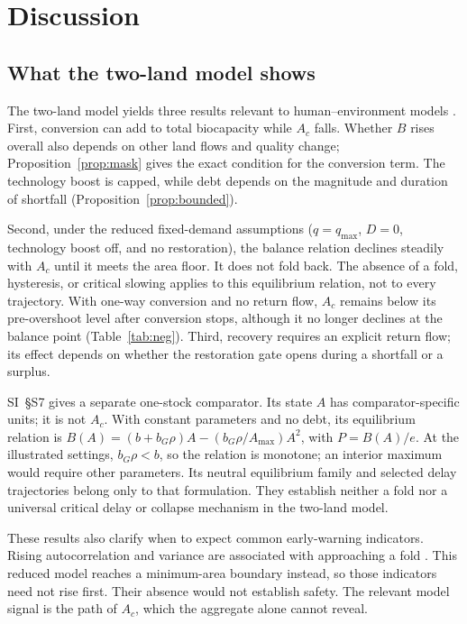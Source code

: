 \documentclass[preprint,12pt,authoryear]{elsarticle}
\begin{document}
\section{Discussion}\label{sec:discussion}

\subsection{What the two-land model shows}

The two-land model yields three results relevant to human--environment models \citep{Schaefer1954,May1973,Meadows1972,Meadows2004,WackernagelRees1996,BranderTaylor1998}. First, conversion can add to total biocapacity while $A_c$ falls. Whether $B$ rises overall also depends on other land flows and quality change; Proposition~\ref{prop:mask} gives the exact condition for the conversion term. The technology boost is capped, while debt depends on the magnitude and duration of shortfall (Proposition~\ref{prop:bounded}).

Second, under the reduced fixed-demand assumptions ($q=q_{\max}$, $D=0$, technology boost off, and no restoration), the balance relation declines steadily with $A_c$ until it meets the area floor. It does not fold back. The absence of a fold, hysteresis, or critical slowing applies to this equilibrium relation, not to every trajectory. With one-way conversion and no return flow, $A_c$ remains below its pre-overshoot level after conversion stops, although it no longer declines at the balance point (Table~\ref{tab:neg}). Third, recovery requires an explicit return flow; its effect depends on whether the restoration gate opens during a shortfall or a surplus.

SI~\S S7 gives a separate one-stock comparator. Its state $A$ has comparator-specific units; it is not $A_c$. With constant parameters and no debt, its equilibrium relation is $B(A)=(b+b_G\rho)A-(b_G\rho/A_{\max})A^2$, with $P=B(A)/e$. At the illustrated settings, $b_G\rho<b$, so the relation is monotone; an interior maximum would require other parameters. Its neutral equilibrium family and selected delay trajectories belong only to that formulation. They establish neither a fold nor a universal critical delay or collapse mechanism in the two-land model.

These results also clarify when to expect common early-warning indicators. Rising autocorrelation and variance are associated with approaching a fold \citep{Scheffer2001}. This reduced model reaches a minimum-area boundary instead, so those indicators need not rise first. Their absence would not establish safety. The relevant model signal is the path of $A_c$, which the aggregate alone cannot reveal.
\end{document}
